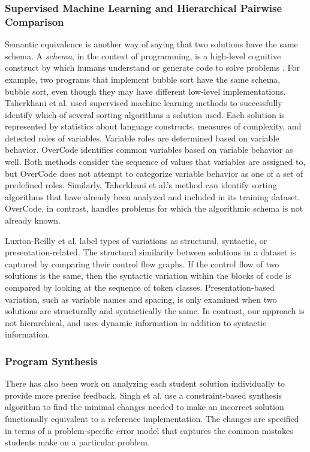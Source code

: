 \subsubsection{Supervised Machine Learning and Hierarchical Pairwise Comparison}

Semantic equivalence is another way of saying that two solutions have the same schema. A {\em schema}, in the context of programming, is a high-level cognitive construct by which humans understand or generate code to solve problems \cite{Soloway1984}. For example, two programs that implement bubble sort have the same schema, bubble sort, even though they may have different low-level implementations. Taherkhani et al. \citeyear{taherkhani12,taherkhani13} used supervised machine learning methods to successfully identify which of several sorting algorithms a solution used. Each solution is represented by statistics about language constructs, measures of complexity, and detected roles of variables. Variable roles are determined based on variable behavior. OverCode identifies common variables based on variable behavior as well. Both methods consider the sequence of values that variables are assigned to, but OverCode does not attempt to categorize variable behavior as one of a set of predefined roles. Similarly, Taherkhani et al.’s method can identify sorting algorithms that have already been analyzed and included in its training dataset. OverCode, in contrast, handles problems for which the algorithmic schema is not already known. 

Luxton-Reilly et al. \citeyear{Luxton13} label types of variations as structural, syntactic, or presentation-related. The structural similarity between solutions in a dataset is captured by comparing their control flow graphs. If the control flow of two solutions is the same, then the syntactic variation within the blocks of code is compared by looking at the sequence of token classes. Presentation-based variation, such as variable names and spacing, is only examined when two solutions are structurally and syntactically the same. In contrast, our approach is not hierarchical, and uses dynamic information in addition to syntactic information.

\subsubsection{Program Synthesis}

There has also been work on analyzing each student solution individually to provide more precise feedback. Singh et al. \citeyear{rishabh} use a constraint-based synthesis algorithm to find the minimal changes needed to make an incorrect solution functionally equivalent to a reference implementation. The changes are specified in terms of a problem-specific error model that captures the common mistakes students make on a particular problem.

